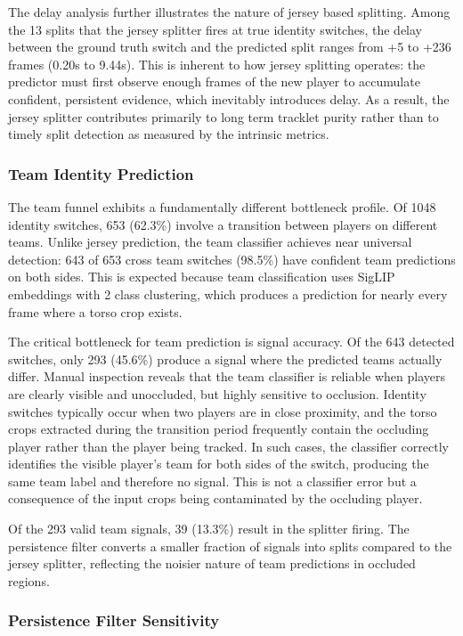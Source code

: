 The delay analysis further illustrates the nature of jersey based splitting. Among the 13 splits that the jersey splitter fires at true identity switches, the delay between the ground truth switch and the predicted split ranges from +5 to +236 frames (0.20s to 9.44s). This is inherent to how jersey splitting operates: the predictor must first observe enough frames of the new player to accumulate confident, persistent evidence, which inevitably introduces delay. As a result, the jersey splitter contributes primarily to long term tracklet purity rather than to timely split detection as measured by the intrinsic metrics.

\subsubsection{Team Identity Prediction}

The team funnel exhibits a fundamentally different bottleneck profile. Of 1048 identity switches, 653 (62.3\%) involve a transition between players on different teams. Unlike jersey prediction, the team classifier achieves near universal detection: 643 of 653 cross team switches (98.5\%) have confident team predictions on both sides. This is expected because team classification uses SigLIP embeddings with 2 class clustering, which produces a prediction for nearly every frame where a torso crop exists.

The critical bottleneck for team prediction is signal accuracy. Of the 643 detected switches, only 293 (45.6\%) produce a signal where the predicted teams actually differ. Manual inspection reveals that the team classifier is reliable when players are clearly visible and unoccluded, but highly sensitive to occlusion. Identity switches typically occur when two players are in close proximity, and the torso crops extracted during the transition period frequently contain the occluding player rather than the player being tracked. In such cases, the classifier correctly identifies the visible player's team for both sides of the switch, producing the same team label and therefore no signal. This is not a classifier error but a consequence of the input crops being contaminated by the occluding player.

Of the 293 valid team signals, 39 (13.3\%) result in the splitter firing. The persistence filter converts a smaller fraction of signals into splits compared to the jersey splitter, reflecting the noisier nature of team predictions in occluded regions.

\subsubsection{Persistence Filter Sensitivity}
\label{sec:persistence-filter-sensitivity}

